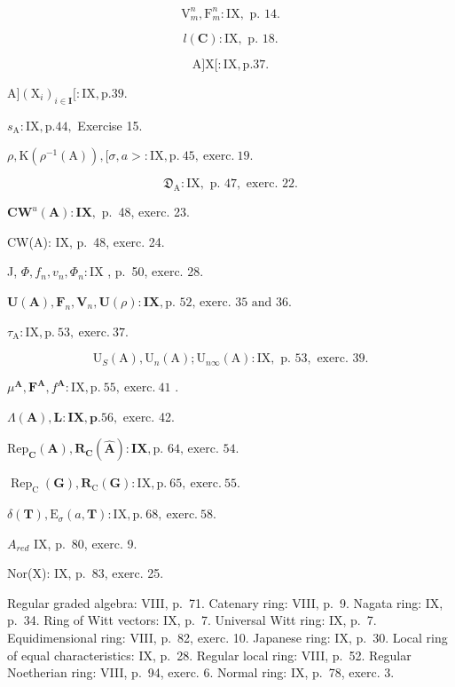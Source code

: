 \[
\mathrm{V} _ {m} ^ {n}, \mathrm{F} _ {m} ^ {n}: \mathrm{IX}, \text { p. } 14.
\]

\[
l (\mathbf {C}): \mathrm{IX}, \text { p. } 18.
\]

\[
\mathrm{A} ] \mathrm{X} [: \mathrm{IX}, \mathrm{p}. 37.
\]

\(\mathrm{A}]\left(\mathrm{X}_{i}\right)_{i\in \mathbf{I}}[: \mathrm{IX},\mathrm{p.}39.\)

\(s_{\mathrm{A}}:\mathrm{IX},\mathrm{p.}44,\) Exercise 15.

\(\rho,\mathrm{K}(\rho^{-1}(\mathrm{A})),[\sigma,a>:\mathrm{IX},\mathrm{p.~45,~exerc.~19}.\)

\[
\mathfrak {D} _ {\mathrm{A}}: \mathrm{IX}, \text { p. } 47, \text { exerc. } 22.
\]

\(\mathbf{CW}^u (\mathbf{A}):\mathbf{IX},\) p.~48, exerc. 23.

CW(A): IX, p.~48, exerc. 24.

J, \(\Phi, f_n, v_n, \Phi_n: \mathrm{IX}\) , p.~50, exerc. 28.

\(\mathbf{U}(\mathbf{A}), \mathbf{F}_n, \mathbf{V}_n, \mathbf{U}(\rho) : \mathbf{IX}, \text{p. 52, exerc. 35 and 36.}\)

\(\tau_{\mathrm{A}}:\mathrm{IX},\mathrm{p.~53,~exerc.~37.}\)

\[
\mathrm{U} _ {S} (\mathrm{A}), \mathrm{U} _ {n} (\mathrm{A}); \mathrm{U} _ {n \infty} (\mathrm{A}): \mathrm{IX}, \text { p. } 53, \text { exerc. } 39.
\]

\(\mu^{\mathbf{A}}, \mathbf{F}^{\mathbf{A}}, f^{\mathbf{A}}: \mathrm{IX}, \mathrm{p.~55,~exerc.~41}\) .

\(\Lambda (\mathbf{A}),\mathbf{L}:\mathbf{IX},\mathbf{p}.56,\) exerc. 42.

\(\mathrm{Rep}_{\mathbf{C}}(\mathbf{A}), \mathbf{R}_{\mathbf{C}}(\mathbf{\hat{A}}) : \mathbf{IX}, \text{p. 64, exerc. 54.}\)

\(\operatorname{Rep}_{\mathrm{C}}(\mathbf{G}), \mathbf{R}_{\mathrm{C}}(\mathbf{G}) : \mathrm{IX}, \mathrm{p.~65,~exerc.~55}.\)

\(\delta (\mathbf{T}),\mathrm{E}_{\sigma}(a,\mathbf{T}):\mathrm{IX},\mathrm{p.~68,~exerc.~58.}\)

\(A_{red}\) IX, p.~80, exerc. 9.

Nor(X): IX, p.~83, exerc. 25.


Regular graded algebra: VIII, p.~71. Catenary ring: VIII, p.~9. Nagata ring: IX, p.~34. Ring of Witt vectors: IX, p.~7. Universal Witt ring: IX, p.~7. Equidimensional ring: VIII, p.~82, exerc. 10. Japanese ring: IX, p.~30. Local ring of equal characteristics: IX, p.~28. Regular local ring: VIII, p.~52. Regular Noetherian ring: VIII, p.~94, exerc. 6. Normal ring: IX, p.~78, exerc. 3.

